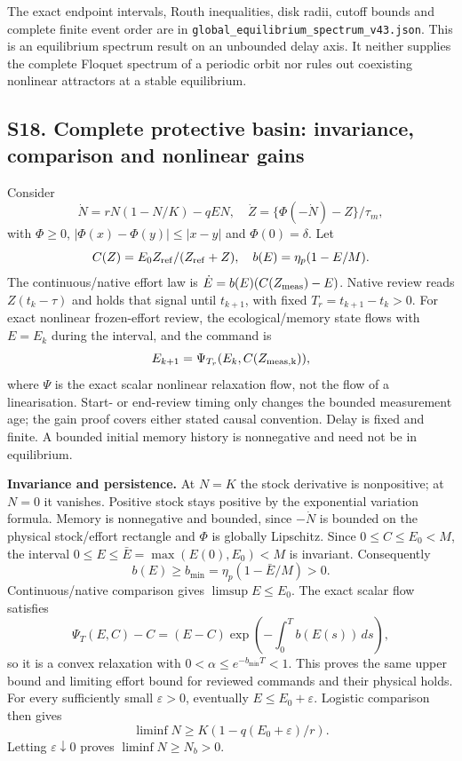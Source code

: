 \documentclass[
  10pt,
  a4paper,
]{article}
\begin{document}
The exact endpoint intervals, Routh inequalities, disk radii, cutoff
bounds and complete finite event order are in
\texttt{global\_equilibrium\_spectrum\_v43.json}. This is an equilibrium
spectrum result on an unbounded delay axis. It neither supplies the
complete Floquet spectrum of a periodic orbit nor rules out coexisting
nonlinear attractors at a stable equilibrium.

\subsection{S18. Complete protective basin: invariance, comparison and
nonlinear
gains}\label{s18.-complete-protective-basin-invariance-comparison-and-nonlinear-gains}

Consider
\[\dot N=rN(1-N/K)-qEN,\quad \dot Z=\{\Phi(-\dot N)-Z\}/\tau_m,\] with
\(\Phi\ge0\), \(|\Phi(x)-\Phi(y)|\le|x-y|\) and \(\Phi(0)=\delta\). Let
\[C(Z)=E_0Z_{\rm ref}/(Z_{\rm ref}+Z),\quad b(E)=\eta_p(1-E/M).\] The
continuous/native effort law is \(\dot E=b(E)(C(Z_{\rm meas})-E)\).
Native review reads \(Z(t_k-\tau)\) and holds that signal until
\(t_{k+1}\), with fixed \(T_r=t_{k+1}-t_k>0\). For exact nonlinear
frozen-effort review, the ecological/memory state flows with \(E=E_k\)
during the interval, and the command is
\[E_{k+1}=\Psi_{T_r}(E_k,C(Z_{\rm meas,k})),\] where \(\Psi\) is the
exact scalar nonlinear relaxation flow, not the flow of a linearisation.
Start- or end-review timing only changes the bounded measurement age;
the gain proof covers either stated causal convention. Delay is fixed
and finite. A bounded initial memory history is nonnegative and need not
be in equilibrium.

\textbf{Invariance and persistence.} At \(N=K\) the stock derivative is
nonpositive; at \(N=0\) it vanishes. Positive stock stays positive by
the exponential variation formula. Memory is nonnegative and bounded,
since \(-\dot N\) is bounded on the physical stock/effort rectangle and
\(\Phi\) is globally Lipschitz. Since \(0\le C\le E_0<M\), the interval
\(0\le E\le\bar E=\max(E(0),E_0)<M\) is invariant. Consequently
\[b(E)\ge b_{\min}=\eta_p(1-\bar E/M)>0.\] Continuous/native comparison
gives \(\limsup E\le E_0\). The exact scalar flow satisfies
\[\Psi_T(E,C)-C=(E-C)\exp\left(-\int_0^T b(E(s))\,ds\right),\] so it is
a convex relaxation with \(0<\alpha\le e^{-b_{\min}T}<1\). This proves
the same upper bound and limiting effort bound for reviewed commands and
their physical holds. For every sufficiently small \(\varepsilon>0\),
eventually \(E\le E_0+\varepsilon\). Logistic comparison then gives
\[\liminf N\ge K(1-q(E_0+\varepsilon)/r).\] Letting
\(\varepsilon\downarrow0\) proves \(\liminf N\ge N_b>0\).
\end{document}
